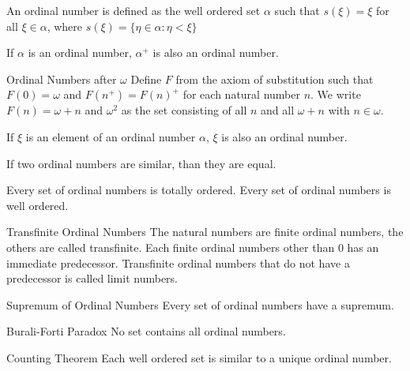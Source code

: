 \documentclass[a4paper]{article}
\begin{document}
\begin{defn}{}{} An ordinal number is defined as the well ordered set $\alpha$ such that $s(\xi)=\xi$ for all $\xi\in\alpha$, where $s(\xi)=\{\eta\in\alpha:\eta<\xi\}$
\end{defn}

\begin{thm}{}{} If $\alpha$ is an ordinal number, $\alpha^+$ is also an ordinal number. 
\end{thm}

\begin{defn}{Ordinal Numbers after $\omega$}{} Define $F$ from the axiom of substitution such that $F(0)=\omega$ and $F(n^+)=F(n)^+$ for each natural number $n$. We write $F(n)=\omega+n$ and $\omega^2$ as the set consisting of all $n$ and all $\omega+n$ with $n\in\omega$. 
\end{defn}

\begin{thm}{}{} If $\xi$ is an element of an ordinal number $\alpha$, $\xi$ is also an ordinal number. 
\end{thm}

\begin{thm}{}{} If two ordinal numbers are similar, than they are equal. 
\end{thm}

\begin{thm}{}{} Every set of ordinal numbers is totally ordered. Every set of ordinal numbers is well ordered. 
\end{thm}

\begin{thm}{Transfinite Ordinal Numbers}{} The natural numbers are finite ordinal numbers, the others are called transfinite. Each finite ordinal numbers other than $0$ has an immediate predecessor. Transfinite ordinal numbers that do not have a predecessor is called limit numbers. 
\end{thm}

\begin{thm}{Supremum of Ordinal Numbers}{} Every set of ordinal numbers have a supremum. 
\end{thm}

\begin{thm}{Burali-Forti Paradox}{} No set contains all ordinal numbers. 
\end{thm}

\begin{thm}{Counting Theorem}{} Each well ordered set is similar to a unique ordinal number. 
\end{thm}
\end{document}
